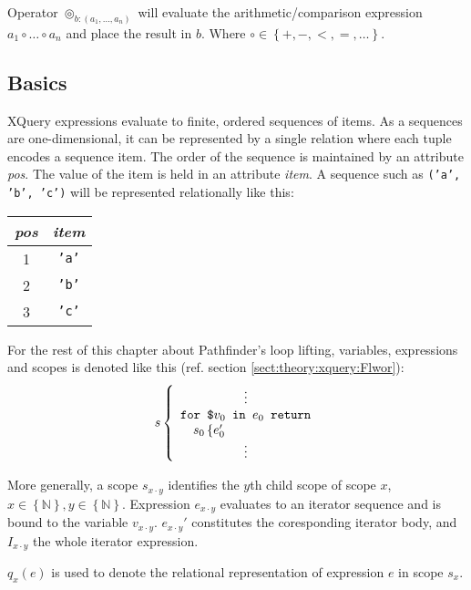 Operator $\circledcirc_{b:(a_{1},\ldots,a_{n})}$ will evaluate the arithmetic/comparison expression $a_{1} \circ
\ldots \circ a_{n}$ and place the result in $b$. Where $\circ \in \left\{ +,- , <, =, \ldots  \right\} $.


\subsection{Basics}
\label{sect:translation:ll:Basics}
XQuery expressions evaluate to finite, ordered sequences of items. As a sequences are one-dimensional, it can be
represented by a single relation where each tuple encodes a sequence item. The order of the sequence is
maintained by an attribute \textit{pos}. The value of the item is held in an attribute \textit{item}. A sequence
such as \texttt{('a', 'b', 'c')} will be represented relationally like this:

\begin{center}
\begin{tabular}{|c|c|}\hline
\textit{pos}	& \textit{item} 	\\ \hline
1				& \texttt{'a'}		\\ \hline
2				& \texttt{'b'}		\\ \hline
3				& \texttt{'c'}		\\ \hline
\end{tabular}
\end{center}

For the rest of this chapter about Pathfinder's loop lifting, variables, expressions and scopes is denoted like
this (ref. section \ref{sect:theory:xquery:Flwor}):
\[
s \left\{
\begin{array}{l}
\qquad \qquad \quad \vdots \\
\mbox{\texttt{for \$}}v_{0}\mbox{\texttt{ in }} e_{0} \mbox{\texttt{ return}} \\
\quad s_{0} \left\{ e_{0}' \right. \\
\qquad \qquad \quad \vdots
\end{array}
\right.
\]

More generally, a scope $s_{x \cdot y}$ identifies the $y$th child scope of scope $x$, $x \in \left\{
\mathbb{N}\right\}, y \in \left\{ \mathbb{N} \right\}$. Expression $e_{x\cdot y}$ evaluates to an iterator sequence
and is bound to the variable $v_{x \cdot y}$. $e_{x \cdot y}'$ constitutes the coresponding iterator body, and $I_{x \cdot y}$ the whole iterator expression.

$q_{x}(e)$ is used to denote the relational representation of expression $e$ in scope $s_{x}$.


